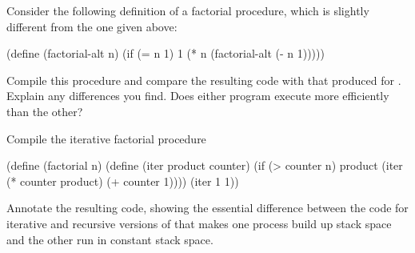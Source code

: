 \begin{exerciseGroup}
\label{Exercise 5.33}
 Consider the following definition
of a factorial procedure, which is slightly different from the one given above:

\begin{codeBlock}
(define (factorial-alt n)
  (if (= n 1)
      1
      (* n (factorial-alt (- n 1)))))
\end{codeBlock}

Compile this procedure and compare the resulting code with that produced for
.  Explain any differences you find.  Does either program
execute more efficiently than the other?

\label{Exercise 5.34}
 Compile the iterative factorial
procedure

\begin{codeBlock}
(define (factorial n)
  (define (iter product counter)
    (if (> counter n)
        product
        (iter (* counter product)
              (+ counter 1))))
  (iter 1 1))
\end{codeBlock}

Annotate the resulting code, showing the essential difference between the code
for iterative and recursive versions of  that makes one process
build up stack space and the other run in constant stack space.


\end{exerciseGroup}
